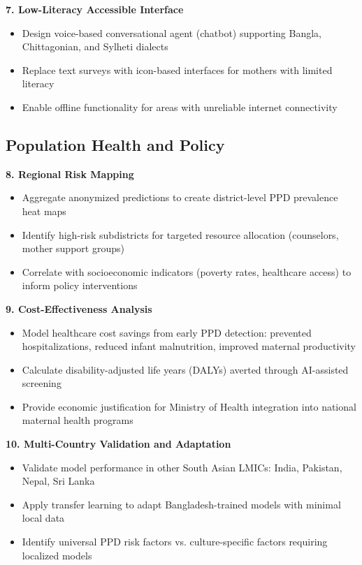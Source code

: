 \textbf{7. Low-Literacy Accessible Interface}
\begin{itemize}
    \item Design voice-based conversational agent (chatbot) supporting Bangla, Chittagonian, and Sylheti dialects
    \item Replace text surveys with icon-based interfaces for mothers with limited literacy
    \item Enable offline functionality for areas with unreliable internet connectivity
\end{itemize}

\subsection{Population Health and Policy}

\textbf{8. Regional Risk Mapping}
\begin{itemize}
    \item Aggregate anonymized predictions to create district-level PPD prevalence heat maps
    \item Identify high-risk subdistricts for targeted resource allocation (counselors, mother support groups)
    \item Correlate with socioeconomic indicators (poverty rates, healthcare access) to inform policy interventions
\end{itemize}

\textbf{9. Cost-Effectiveness Analysis}
\begin{itemize}
    \item Model healthcare cost savings from early PPD detection: prevented hospitalizations, reduced infant malnutrition, improved maternal productivity
    \item Calculate disability-adjusted life years (DALYs) averted through AI-assisted screening
    \item Provide economic justification for Ministry of Health integration into national maternal health programs
\end{itemize}

\textbf{10. Multi-Country Validation and Adaptation}
\begin{itemize}
    \item Validate model performance in other South Asian LMICs: India, Pakistan, Nepal, Sri Lanka
    \item Apply transfer learning to adapt Bangladesh-trained models with minimal local data
    \item Identify universal PPD risk factors vs. culture-specific factors requiring localized models
\end{itemize}

